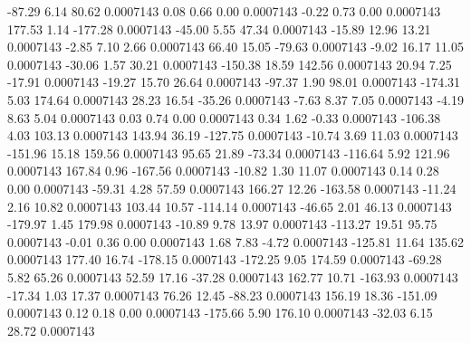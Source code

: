       -87.29        6.14       80.62     0.0007143
        0.08        0.66        0.00     0.0007143
       -0.22        0.73        0.00     0.0007143
      177.53        1.14     -177.28     0.0007143
      -45.00        5.55       47.34     0.0007143
      -15.89       12.96       13.21     0.0007143
       -2.85        7.10        2.66     0.0007143
       66.40       15.05      -79.63     0.0007143
       -9.02       16.17       11.05     0.0007143
      -30.06        1.57       30.21     0.0007143
     -150.38       18.59      142.56     0.0007143
       20.94        7.25      -17.91     0.0007143
      -19.27       15.70       26.64     0.0007143
      -97.37        1.90       98.01     0.0007143
     -174.31        5.03      174.64     0.0007143
       28.23       16.54      -35.26     0.0007143
       -7.63        8.37        7.05     0.0007143
       -4.19        8.63        5.04     0.0007143
        0.03        0.74        0.00     0.0007143
        0.34        1.62       -0.33     0.0007143
     -106.38        4.03      103.13     0.0007143
      143.94       36.19     -127.75     0.0007143
      -10.74        3.69       11.03     0.0007143
     -151.96       15.18      159.56     0.0007143
       95.65       21.89      -73.34     0.0007143
     -116.64        5.92      121.96     0.0007143
      167.84        0.96     -167.56     0.0007143
      -10.82        1.30       11.07     0.0007143
        0.14        0.28        0.00     0.0007143
      -59.31        4.28       57.59     0.0007143
      166.27       12.26     -163.58     0.0007143
      -11.24        2.16       10.82     0.0007143
      103.44       10.57     -114.14     0.0007143
      -46.65        2.01       46.13     0.0007143
     -179.97        1.45      179.98     0.0007143
      -10.89        9.78       13.97     0.0007143
     -113.27       19.51       95.75     0.0007143
       -0.01        0.36        0.00     0.0007143
        1.68        7.83       -4.72     0.0007143
     -125.81       11.64      135.62     0.0007143
      177.40       16.74     -178.15     0.0007143
     -172.25        9.05      174.59     0.0007143
      -69.28        5.82       65.26     0.0007143
       52.59       17.16      -37.28     0.0007143
      162.77       10.71     -163.93     0.0007143
      -17.34        1.03       17.37     0.0007143
       76.26       12.45      -88.23     0.0007143
      156.19       18.36     -151.09     0.0007143
        0.12        0.18        0.00     0.0007143
     -175.66        5.90      176.10     0.0007143
      -32.03        6.15       28.72     0.0007143

